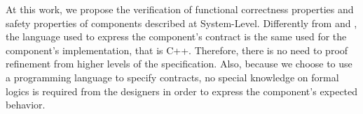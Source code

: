 
At this work, we propose the verification of functional correctness properties
and safety properties
of components described at System-Level.
Differently from \cite{Klein:2009} and \cite{Cohen:2010}, the language used to
express the component's contract is the same used for
the component's implementation, that is C++.
Therefore, there is no need to proof refinement from higher levels of the
specification.
Also, because we choose to use a programming language to specify contracts,
no special knowledge on formal logics is required from the designers
in order to express the component's expected behavior.

